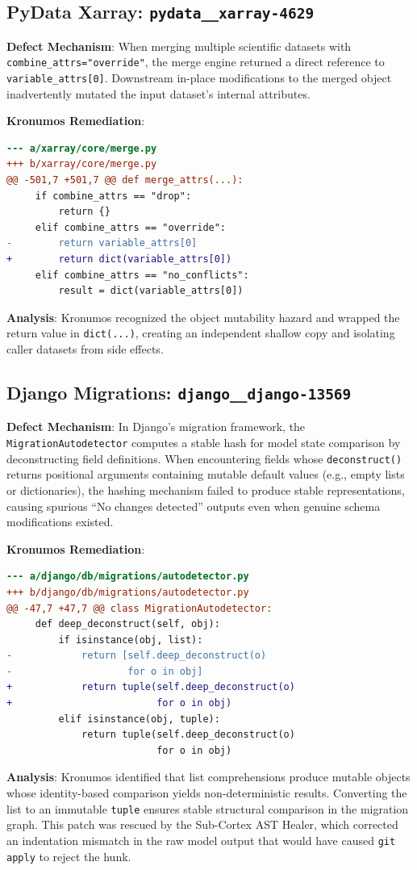 \documentclass[10pt,twocolumn,letterpaper]{article}
\begin{document}
\subsection{PyData Xarray: \texttt{pydata\_\_xarray-4629}}
\textbf{Defect Mechanism}: When merging multiple scientific datasets with \texttt{combine\_attrs="override"}, the merge engine returned a direct reference to \texttt{variable\_attrs[0]}. Downstream in-place modifications to the merged object inadvertently mutated the input dataset's internal attributes.

\textbf{Kronumos Remediation}:
\begin{lstlisting}[language=diff]
--- a/xarray/core/merge.py
+++ b/xarray/core/merge.py
@@ -501,7 +501,7 @@ def merge_attrs(...):
     if combine_attrs == "drop":
         return {}
     elif combine_attrs == "override":
-        return variable_attrs[0]
+        return dict(variable_attrs[0])
     elif combine_attrs == "no_conflicts":
         result = dict(variable_attrs[0])
\end{lstlisting}
\textbf{Analysis}: Kronumos recognized the object mutability hazard and wrapped the return value in \texttt{dict(...)}, creating an independent shallow copy and isolating caller datasets from side effects.

\subsection{Django Migrations: \texttt{django\_\_django-13569}}
\textbf{Defect Mechanism}: In Django's migration framework, the \texttt{MigrationAutodetector} computes a stable hash for model state comparison by deconstructing field definitions. When encountering fields whose \texttt{deconstruct()} returns positional arguments containing mutable default values (e.g., empty lists or dictionaries), the hashing mechanism failed to produce stable representations, causing spurious ``No changes detected'' outputs even when genuine schema modifications existed.

\textbf{Kronumos Remediation}:
\begin{lstlisting}[language=diff]
--- a/django/db/migrations/autodetector.py
+++ b/django/db/migrations/autodetector.py
@@ -47,7 +47,7 @@ class MigrationAutodetector:
     def deep_deconstruct(self, obj):
         if isinstance(obj, list):
-            return [self.deep_deconstruct(o)
-                    for o in obj]
+            return tuple(self.deep_deconstruct(o)
+                         for o in obj)
         elif isinstance(obj, tuple):
             return tuple(self.deep_deconstruct(o)
                          for o in obj)
\end{lstlisting}
\textbf{Analysis}: Kronumos identified that list comprehensions produce mutable objects whose identity-based comparison yields non-deterministic results. Converting the list to an immutable \texttt{tuple} ensures stable structural comparison in the migration graph. This patch was rescued by the Sub-Cortex AST Healer, which corrected an indentation mismatch in the raw model output that would have caused \texttt{git apply} to reject the hunk.
\end{document}
